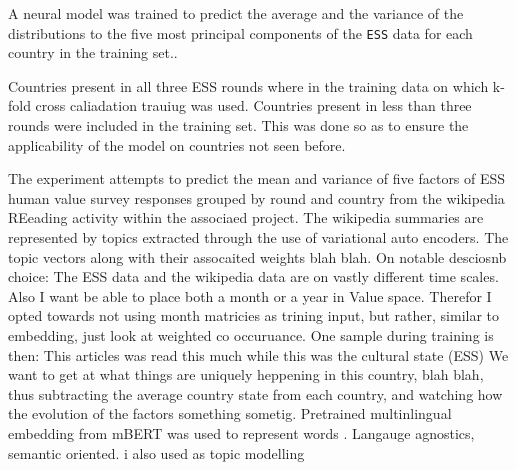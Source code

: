 A neural model was trained to predict the average and the variance of the distributions to the five most principal components of the \texttt{ESS} data for each country in the training set..

Countries present in all three ESS rounds where in the training data on which k-fold cross caliadation trauiug was used.
Countries present in less than three rounds were included in the training set. This was done so as to
ensure the applicability of the model on countries not seen before.

The experiment attempts to predict the mean and variance of five factors of ESS human value survey responses grouped by round and country from the wikipedia REeading activity within the associaed project.
The wikipedia summaries are represented by topics extracted through the use of variational auto encoders. The topic vectors along with their assocaited weights blah blah.
On notable desciosnb choice: The ESS data and the wikipedia data are on vastly different time scales. Also I want be able to place both a month or a year in Value space. Therefor I opted towards not using month matricies as trining input, but rather, similar to embedding, just look at weighted co occuruance. One sample during training is then: This articles was read this much while this was the cultural state (ESS)
We want to get at what things are uniquely heppening in this country, blah blah, thus subtracting the average country state from each country, and watching how the evolution of the factors something sometig.
Pretrained multinlingual embedding from mBERT was used to represent words \cite{artetxe-etal-2017-learning}. Langauge agnostics, semantic oriented.
\cite{kingma2013auto} i also used as topic modelling
\cite{DBLP:journals/corr/abs-1810-04805}
\cite{Wu2020}
